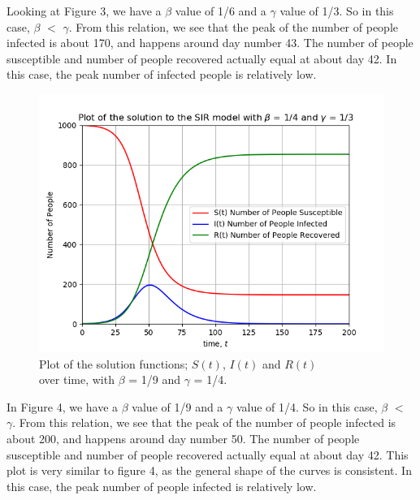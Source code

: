 \documentclass{article}
\begin{document}
Looking at Figure 3, we have a $\beta$ value of 1/6 and a $\gamma$ value of 1/3. 
So in this case, $\beta$ $<$ $\gamma$.
From this relation, we see that the peak of the number of people infected is about 170, and happens around day number 43.
The number of people susceptible and number of people recovered actually equal at  about day 42.
In this case, the peak number of infected people is relatively low.
\bigskip

\begin{figure}[!htb]
  \centering
  \includegraphics[width=1\linewidth]{Q2_plot2.png}
  \caption{Plot of the solution functions; $S(t)$, $I(t)$ and $R(t)$ \\ over time, with $\beta$ = 1/9 and $\gamma$ = 1/4.}
  \label{fig:Q2_plot2.png}
\end{figure}

In Figure 4, we have a $\beta$ value of 1/9 and a $\gamma$ value of 1/4. 
So in this case, $\beta$ $<$ $\gamma$.
From this relation, we see that the peak of the number of people infected is about 200, and happens around day number 50.
The number of people susceptible and number of people recovered actually equal at  about day 42.
This plot is very similar to figure 4, as the general shape of the curves is consistent.
In this case, the peak number of people infected is relatively low.
\newpage
\end{document}
